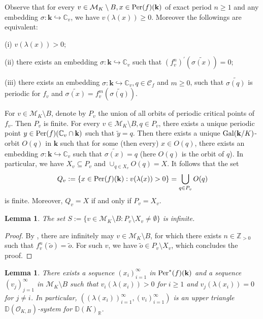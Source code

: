\documentclass[12pt]{amsart}
\theoremstyle{plain}
\newtheorem{Lem}[Thm]{Lemma}
\theoremstyle{remark}
\theoremstyle{definition}
\def\Z{\mathbb Z}
\def\R{\mathbb R}
\def\C{\mathbb C}
\def\D{\mathbb D}
\begin{document}
Observe that for every $v \in \mathcal{M}_K \setminus B, x \in {\rm Per}(f)(\mathbf{k})$ of exact period $n \geq 1$ and any embedding $\sigma: \mathbf{k} \hookrightarrow \C_{v}$, we have $v(\lambda(x))\geq 0$. Moreover the followings are equivalent:\par
(i) $v(\lambda(x))>0$;\par
(ii) there exists an embedding $\sigma: \mathbf{k} \hookrightarrow \C_{v}$ such that $(f^{n}_v)^{\prime}(\widetilde{\sigma(x)})=0$;\par
(iii) there exists an embedding $\sigma: \mathbf{k} \hookrightarrow \C_{v}, q \in \mathcal{C}_f$ and $m \geq 0$, such that $\widetilde{\sigma(q)}$ is periodic for $f_{v}$ and $\widetilde{\sigma(x)}=f_{v}^{m}(\widetilde{\sigma(q)})$.\par
For $v \in \mathcal{M}_K \setminus B$, denote by $P_{v}$ the union of all orbits of periodic critical points of $f_{v}$. Then $P_{v}$ is finite. For every $v \in \mathcal{M}_K \setminus B, q \in P_{v}$, there exists a unique periodic point $y \in {\rm Per}(f)(\C_{v} \cap \mathbf{k})$ such that $\tilde{y}=q$. Then there exists a unique ${\rm Gal}(\mathbf{k} / K)$-orbit $O(q)$ in $\mathbf{k}$ such that for some (then every) $x \in O(q)$, there exists an embedding $\sigma: \mathbf{k} \hookrightarrow \C_{v}$ such that $\widetilde{\sigma(x)}=q$ (here $O(q)$ is the orbit of $q$). In particular, we have $X_{v} \subseteq P_{v}$ and $\cup_{q \in X_{v}} O(q)=X$. It follows that the set$$Q_{v}:=\{x \in {\rm Per}(f)(\mathbf{k}):v(\lambda(x))>0\}=\bigcup_{q \in P_{v}} O(q)$$is finite. Moreover, $Q_{v}=X$ if and only if $P_{v}=X_{v}$.
\begin{Lem}\label{lem5.1}
	The set $S:=\{v \in \mathcal{M}_K \setminus B:P_{v} \setminus X_{v} \neq \emptyset\}$ is infinite.
\end{Lem}
\begin{proof}
	By \cite[Lemma 4.1]{Benedetto2012}, there are infinitely may $v \in \mathcal{M}_K \setminus B$, for which there exists $n \in\Z_{>0}$ such that $f_{v}^{n}(\tilde{o})=\tilde{o}$. For such $v$, we have $\tilde{o} \in P_{v} \setminus X_{v}$, which concludes the proof.
\end{proof}
\begin{Lem}\label{lem5.2}There exists a sequence $(x_{i})_{i=1}^\infty$ in ${\rm Per}^*(f)(\mathbf{k})$ and a sequence $(v_{j})_{j=1}^\infty$ in $\mathcal{M}_{K} \setminus B$ such that $v_{i}(\lambda(x_{i}))>0$ for $i\geq1$ and $v_{j}(\lambda(x_{i}))=0$ for $j \neq i$. In particular, $((\lambda(x_{i}))_{i=1}^\infty,(v_{i})_{i=1}^\infty)$ is an upper triangle $\D(\mathcal{O}_{K, B})$-system for $\D(K)_{\R}$.
\end{Lem}
\end{document}
